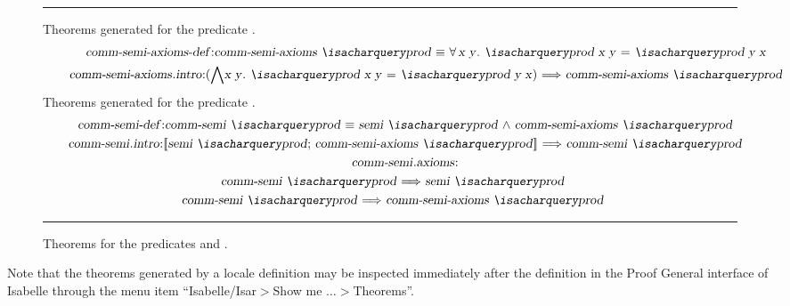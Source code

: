 \begin{isabellebody}
\begin{isamarkuptext}
  \begin{figure}[h]
  \hrule
  \vspace{2ex}
  Theorems generated for the predicate .
  \begin{gather}
    \tag*{\isa{comm{\isacharunderscore}semi{\isacharunderscore}axioms{\isacharunderscore}def}:} \isa{comm{\isacharunderscore}semi{\isacharunderscore}axioms\ {\isacharquery}prod\ {\isasymequiv}\ {\isasymforall}x\ y{\isachardot}\ {\isacharquery}prod\ x\ y\ {\isacharequal}\ {\isacharquery}prod\ y\ x} \\                        
    \tag*{\isa{comm{\isacharunderscore}semi{\isacharunderscore}axioms{\isachardot}intro}:} \isa{{\isacharparenleft}{\isasymAnd}x\ y{\isachardot}\ {\isacharquery}prod\ x\ y\ {\isacharequal}\ {\isacharquery}prod\ y\ x{\isacharparenright}\ {\isasymLongrightarrow}\ comm{\isacharunderscore}semi{\isacharunderscore}axioms\ {\isacharquery}prod}                       
  \end{gather}
  Theorems generated for the predicate .
  \begin{gather}
    \tag*{\isa{comm{\isacharunderscore}semi{\isacharunderscore}def}:} \isa{comm{\isacharunderscore}semi\ {\isacharquery}prod\ {\isasymequiv}\ semi\ {\isacharquery}prod\ {\isasymand}\ comm{\isacharunderscore}semi{\isacharunderscore}axioms\ {\isacharquery}prod} \\                          
    \tag*{\isa{comm{\isacharunderscore}semi{\isachardot}intro}:} \isa{{\isasymlbrakk}semi\ {\isacharquery}prod{\isacharsemicolon}\ comm{\isacharunderscore}semi{\isacharunderscore}axioms\ {\isacharquery}prod{\isasymrbrakk}\ {\isasymLongrightarrow}\ comm{\isacharunderscore}semi\ {\isacharquery}prod} \\
    \tag*{\isa{comm{\isacharunderscore}semi{\isachardot}axioms}:} \mbox{} \\
    \notag \isa{comm{\isacharunderscore}semi\ {\isacharquery}prod\ {\isasymLongrightarrow}\ semi\ {\isacharquery}prod} \\
    \notag \isa{comm{\isacharunderscore}semi\ {\isacharquery}prod\ {\isasymLongrightarrow}\ comm{\isacharunderscore}semi{\isacharunderscore}axioms\ {\isacharquery}prod}               
  \end{gather} 
  \hrule
  \caption{Theorems for the predicates  and
    .}
  \label{fig-theorems-comm-semi}
  \end{figure}
  Note that the theorems generated by a locale
  definition may be inspected immediately after the definition in the
  Proof General interface \cite{Aspinall2000} of Isabelle through
  the menu item ``Isabelle/Isar$>$Show me $\ldots>$Theorems''.


\end{isamarkuptext}
\end{isabellebody}
